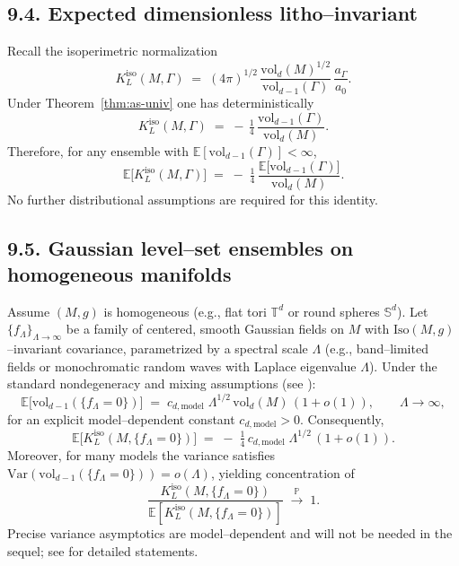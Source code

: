 \subsection*{9.4. Expected dimensionless litho–invariant}
Recall the isoperimetric normalization
\[
K_L^{\mathrm{iso}}(M,\Gamma)\;=\;(4\pi)^{1/2}\,\frac{\mathrm{vol}_d(M)^{1/2}}{\mathrm{vol}_{d-1}(\Gamma)}\,\frac{a_\Gamma}{a_0}.
\]
Under Theorem~\ref{thm:as-univ} one has deterministically
\[
K_L^{\mathrm{iso}}(M,\Gamma)\;=\; -\,\tfrac14\,\frac{\mathrm{vol}_{d-1}(\Gamma)}{\mathrm{vol}_d(M)}.
\]
Therefore, for any ensemble with $\mathbb{E}[\mathrm{vol}_{d-1}(\Gamma)]<\infty$,
\[
\mathbb{E}\big[K_L^{\mathrm{iso}}(M,\Gamma)\big]\;=\;-\;\tfrac14\,\frac{\mathbb{E}\big[\mathrm{vol}_{d-1}(\Gamma)\big]}{\mathrm{vol}_d(M)}.
\]
No further distributional assumptions are required for this identity.

\subsection*{9.5. Gaussian level–set ensembles on homogeneous manifolds}
Assume $(M,g)$ is homogeneous (e.g., flat tori $\mathbb{T}^d$ or round spheres $\mathbb{S}^d$). Let $\{f_\Lambda\}_{\Lambda\to\infty}$ be a family of centered, smooth Gaussian fields on $M$ with $\mathrm{Iso}(M,g)$–invariant covariance, parametrized by a spectral scale $\Lambda$ (e.g., band–limited fields or monochromatic random waves with Laplace eigenvalue $\Lambda$). Under the standard nondegeneracy and mixing assumptions (see \cite{AdlerTaylor07,Wigman15}):
\[
\mathbb{E}\big[\mathrm{vol}_{d-1}(\{f_\Lambda=0\})\big]\;=\;c_{d,\mathrm{model}}\;\Lambda^{1/2}\,\mathrm{vol}_d(M)\,(1+o(1)),\qquad \Lambda\to\infty,
\]
for an explicit model–dependent constant $c_{d,\mathrm{model}}>0$. Consequently,
\[
\mathbb{E}\big[K_L^{\mathrm{iso}}(M,\{f_\Lambda=0\})\big]\;=\;-\;\tfrac14\,c_{d,\mathrm{model}}\;\Lambda^{1/2}\,(1+o(1)).
\]
Moreover, for many models the variance satisfies $\mathrm{Var}(\mathrm{vol}_{d-1}(\{f_\Lambda=0\}))=o(\Lambda)$, yielding concentration of
\[
\frac{K_L^{\mathrm{iso}}(M,\{f_\Lambda=0\})}{\mathbb{E}[K_L^{\mathrm{iso}}(M,\{f_\Lambda=0\})]}\;\xrightarrow{\ \mathbb{P}\ }\;1.
\]
Precise variance asymptotics are model–dependent and will not be needed in the sequel; see \cite{NazarovSodin16,Wigman15} for detailed statements.

